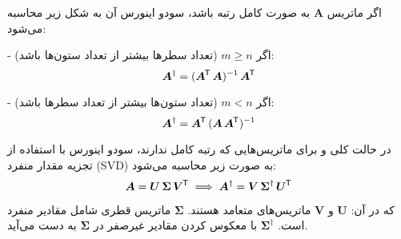 \documentclass[12pt,onecolumn,a4paper]{article}
\newcommand*{\transpose}{{\mkern-1.5mu\mathsf{T}}}
\begin{document}
\noindent
اگر ماتریس \( \bm{A} \) به صورت کامل رتبه باشد، سودو اینورس آن به شکل زیر محاسبه می‌شود:

\noindent
- اگر \( m \geq n \) (تعداد سطرها بیشتر از تعداد ستون‌ها باشد):
\begin{equation}
	\bm{A}^\dagger = (\bm{A}^\transpose \, \bm{A})^{-1} \, \bm{A}^\transpose
\end{equation}

\noindent
- اگر \( m < n \) (تعداد ستون‌ها بیشتر از تعداد سطرها باشد):
\begin{equation}
	\bm{A}^\dagger = \bm{A}^\transpose \, (\bm{A} \, \bm{A}^\transpose)^{-1}
\end{equation}

\noindent
در حالت کلی و برای ماتریس‌هایی که رتبه کامل ندارند، سودو اینورس با استفاده از تجزیه مقدار منفرد (SVD) به صورت زیر محاسبه می‌شود:
\begin{equation}
	\bm{A} = \bm{U} \, \bm{\Sigma} \, \bm{V}^\transpose \implies \bm{A}^\dagger = \bm{V} \, \bm{\Sigma}^\dagger \, \bm{U}^\transpose
\end{equation}

که در آن:
\( \bm{U} \) و \( \bm{V} \) ماتریس‌های متعامد هستند.
\( \bm{\Sigma} \) ماتریس قطری شامل مقادیر منفرد است.
\( \bm{\Sigma}^\dagger \) با معکوس کردن مقادیر غیرصفر در \( \bm{\Sigma} \) به دست می‌آید.



	\newpage
	
	
	
	
\end{document}
